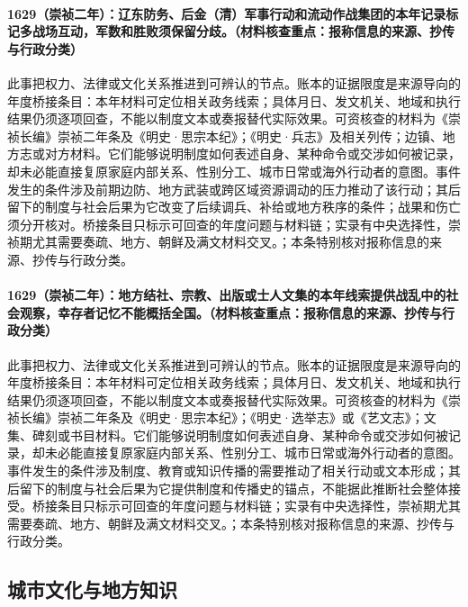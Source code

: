 \paragraph{1629（崇祯二年）：辽东防务、后金（清）军事行动和流动作战集团的本年记录标记多战场互动，军数和胜败须保留分歧。（材料核查重点：报称信息的来源、抄传与行政分类）} 此事把权力、法律或文化关系推进到可辨认的节点。账本的证据限度是来源导向的年度桥接条目：本年材料可定位相关政务线索；具体月日、发文机关、地域和执行结果仍须逐项回查，不能以制度文本或奏报替代实际效果。可资核查的材料为《崇祯长编》崇祯二年条及《明史·思宗本纪》；《明史·兵志》及相关列传；边镇、地方志或对方材料。它们能够说明制度如何表述自身、某种命令或交涉如何被记录，却未必能直接复原家庭内部关系、性别分工、城市日常或海外行动者的意图。事件发生的条件涉及前期边防、地方武装或跨区域资源调动的压力推动了该行动；其后留下的制度与社会后果为它改变了后续调兵、补给或地方秩序的条件；战果和伤亡须分开核对。桥接条目只标示可回查的年度问题与材料链；实录有中央选择性，崇祯期尤其需要奏疏、地方、朝鲜及满文材料交叉。；本条特别核对报称信息的来源、抄传与行政分类。

\paragraph{1629（崇祯二年）：地方结社、宗教、出版或士人文集的本年线索提供战乱中的社会观察，幸存者记忆不能概括全国。（材料核查重点：报称信息的来源、抄传与行政分类）} 此事把权力、法律或文化关系推进到可辨认的节点。账本的证据限度是来源导向的年度桥接条目：本年材料可定位相关政务线索；具体月日、发文机关、地域和执行结果仍须逐项回查，不能以制度文本或奏报替代实际效果。可资核查的材料为《崇祯长编》崇祯二年条及《明史·思宗本纪》；《明史·选举志》或《艺文志》；文集、碑刻或书目材料。它们能够说明制度如何表述自身、某种命令或交涉如何被记录，却未必能直接复原家庭内部关系、性别分工、城市日常或海外行动者的意图。事件发生的条件涉及制度、教育或知识传播的需要推动了相关行动或文本形成；其后留下的制度与社会后果为它提供制度和传播史的锚点，不能据此推断社会整体接受。桥接条目只标示可回查的年度问题与材料链；实录有中央选择性，崇祯期尤其需要奏疏、地方、朝鲜及满文材料交叉。；本条特别核对报称信息的来源、抄传与行政分类。

\subsection{城市文化与地方知识}

